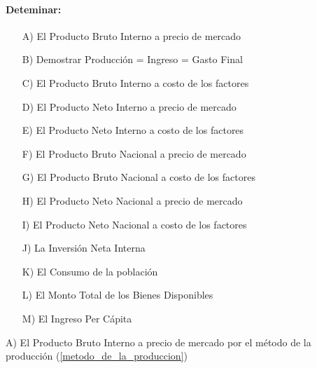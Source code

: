\documentclass[12pt,a4paper]{article}
\newcommand{\consigna}[1]{\paragraph{\indent #1} \hspace{0pt}}
\begin{document}
        \newpage
        
        \consigna{Deteminar:}
        
        \begin{itemize}
			\item[A)] El Producto Bruto Interno a precio de mercado
            
            \item[B)] Demostrar Producción = Ingreso = Gasto Final
            
            \item[C)] El Producto Bruto Interno a costo de los factores
            
            \item[D)] El Producto Neto Interno a precio de mercado
            
            \item[E)] El Producto Neto Interno a costo de los factores
            
            \item[F)] El Producto Bruto Nacional a precio de mercado
            
            \item[G)] El Producto Bruto Nacional a costo de los factores
            
            \item[H)] El Producto Neto Nacional a precio de mercado
            
            \item[I)] El Producto Neto Nacional a costo de los factores
            
            \item[J)] La Inversión Neta Interna
            
            \item[K)] El Consumo de la población
            
            \item[L)] El Monto Total de los Bienes Disponibles
            
            \item[M)] El Ingreso Per Cápita
            
		\end{itemize}
        
        \hrulefill
        
        \vspace{0.4cm}
        
        A) El Producto Bruto Interno a precio de mercado por el método de la producción (\ref{metodo_de_la_produccion})
        
\end{document}
